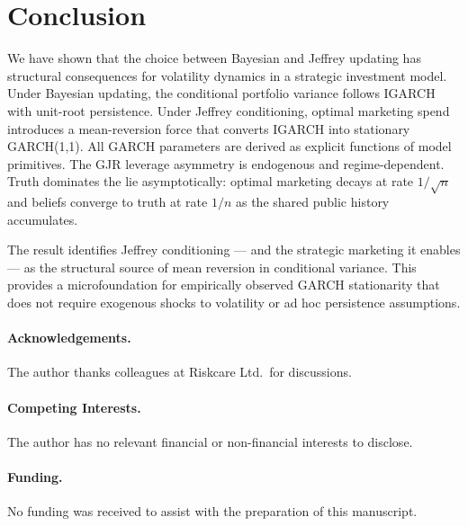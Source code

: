 \documentclass[12pt,a4paper]{article}
\newcommand{\1}{\mathbf{1}}
\begin{document}
\section{Conclusion}
\label{sec:conclusion}

We have shown that the choice between Bayesian and Jeffrey updating
has structural consequences for volatility dynamics in a strategic
investment model. Under Bayesian updating, the conditional portfolio
variance follows IGARCH with unit-root persistence. Under Jeffrey
conditioning, optimal marketing spend introduces a mean-reversion
force that converts IGARCH into stationary GARCH(1,1). All GARCH
parameters are derived as explicit functions of model primitives.
The GJR leverage asymmetry is endogenous and regime-dependent.
Truth dominates the lie asymptotically: optimal marketing decays
at rate $1/\sqrt{n}$ and beliefs converge to truth at rate $1/n$
as the shared public history accumulates.

The result identifies Jeffrey conditioning --- and the strategic
marketing it enables --- as the structural source of mean reversion
in conditional variance. This provides a microfoundation for
empirically observed GARCH stationarity that does not require
exogenous shocks to volatility or ad hoc persistence assumptions.

\paragraph{Acknowledgements.}
The author thanks colleagues at Riskcare Ltd.\ for discussions.

\paragraph{Competing Interests.}
The author has no relevant financial or non-financial interests
to disclose.

\paragraph{Funding.}
No funding was received to assist with the preparation of this
manuscript.
\end{document}
